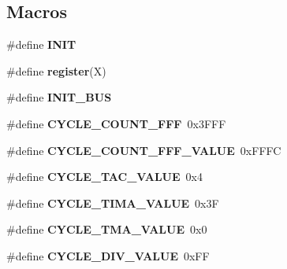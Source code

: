 \subsection*{Macros}
\begin{DoxyCompactItemize}
\item 
\#define {\bfseries I\+N\+IT}
\item 
\#define {\bfseries register}(X)
\item 
\#define {\bfseries I\+N\+I\+T\+\_\+\+B\+US}
\item 
\mbox{\label{unit-test-timer_8c_a879b1c84bdfa8bcf78e8d0598f2eb608}} 
\#define {\bfseries C\+Y\+C\+L\+E\+\_\+\+C\+O\+U\+N\+T\+\_\+F\+FF}~0x3\+F\+FF
\item 
\mbox{\label{unit-test-timer_8c_a26a685d3b1b76bfbd896619a8fa92a86}} 
\#define {\bfseries C\+Y\+C\+L\+E\+\_\+\+C\+O\+U\+N\+T\+\_\+F\+F\+F\+\_\+\+V\+A\+L\+UE}~0x\+F\+F\+FC
\item 
\mbox{\label{unit-test-timer_8c_ab48e889c40cd52913354517971c2a988}} 
\#define {\bfseries C\+Y\+C\+L\+E\+\_\+\+T\+A\+C\+\_\+\+V\+A\+L\+UE}~0x4
\item 
\mbox{\label{unit-test-timer_8c_a051dcd162f2226d2d669af3a3b1fff22}} 
\#define {\bfseries C\+Y\+C\+L\+E\+\_\+\+T\+I\+M\+A\+\_\+\+V\+A\+L\+UE}~0x3F
\item 
\mbox{\label{unit-test-timer_8c_ae4e654efa8891a8480a9cfd3655c9ac2}} 
\#define {\bfseries C\+Y\+C\+L\+E\+\_\+\+T\+M\+A\+\_\+\+V\+A\+L\+UE}~0x0
\item 
\mbox{\label{unit-test-timer_8c_a3f16b1cbb1908ded4ed54a21acb73bac}} 
\#define {\bfseries C\+Y\+C\+L\+E\+\_\+\+D\+I\+V\+\_\+\+V\+A\+L\+UE}~0x\+FF
\end{DoxyCompactItemize}
